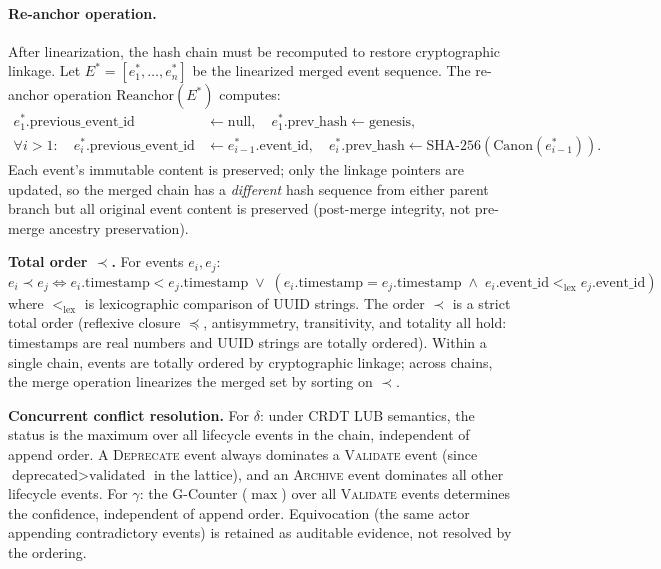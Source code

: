 \paragraph{Re-anchor operation.} After linearization, the hash chain must be recomputed to restore cryptographic linkage. Let $E^* = [e^*_1, \dots, e^*_n]$ be the linearized merged event sequence. The re-anchor operation $\text{Reanchor}(E^*)$ computes:
\begin{align}
    e^*_1.\text{previous\_event\_id} &\gets \text{null}, \quad e^*_1.\text{prev\_hash} \gets \text{genesis}, \\
    \forall i > 1: \quad e^*_i.\text{previous\_event\_id} &\gets e^*_{i-1}.\text{event\_id}, \quad e^*_i.\text{prev\_hash} \gets \text{SHA-256}(\text{Canon}(e^*_{i-1})).
\end{align}
Each event's immutable content is preserved; only the linkage pointers are updated, so the merged chain has a \emph{different} hash sequence from either parent branch but all original event content is preserved (post-merge integrity, not pre-merge ancestry preservation).

\textbf{Total order $\prec$.} For events $e_i, e_j$:
\begin{equation}\label{eq:total-order}
    e_i \prec e_j \iff e_i.\text{timestamp} < e_j.\text{timestamp} \;\lor\; (e_i.\text{timestamp} = e_j.\text{timestamp} \;\land\; e_i.\text{event\_id} <_{\text{lex}} e_j.\text{event\_id})
\end{equation}
where $<_{\text{lex}}$ is lexicographic comparison of UUID strings. The order $\prec$ is a strict total order (reflexive closure $\preceq$, antisymmetry, transitivity, and totality all hold: timestamps are real numbers and UUID strings are totally ordered). Within a single chain, events are totally ordered by cryptographic linkage; across chains, the merge operation linearizes the merged set by sorting on $\prec$.

\textbf{Concurrent conflict resolution.} For $\delta$: under CRDT LUB semantics, the status is the maximum over all lifecycle events in the chain, independent of append order. A \textsc{Deprecate} event always dominates a \textsc{Validate} event (since $\text{deprecated} > \text{validated}$ in the lattice), and an \textsc{Archive} event dominates all other lifecycle events. For $\gamma$: the G-Counter ($\max$) over all \textsc{Validate} events determines the confidence, independent of append order. Equivocation (the same actor appending contradictory events) is retained as auditable evidence, not resolved by the ordering.

